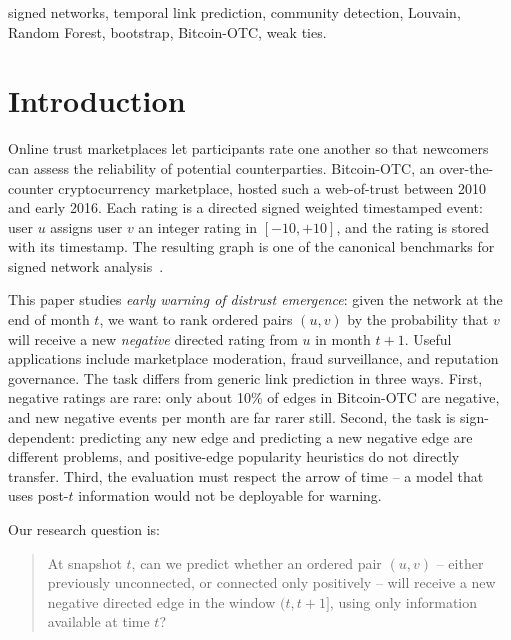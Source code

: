 \documentclass[conference]{IEEEtran}
\begin{document}
\begin{IEEEkeywords}
signed networks, temporal link prediction, community detection,
Louvain, Random Forest, bootstrap, Bitcoin-OTC, weak ties.
\end{IEEEkeywords}

\section{Introduction}

Online trust marketplaces let participants rate one another so that
newcomers can assess the reliability of potential counterparties.
Bitcoin-OTC, an over-the-counter cryptocurrency marketplace, hosted
such a web-of-trust between 2010 and early 2016. Each rating is a
directed signed weighted timestamped event: user $u$ assigns user $v$
an integer rating in $[-10, +10]$, and the rating is stored with its
timestamp. The resulting graph is one of the canonical benchmarks for
signed network analysis~\cite{kumar2016}.

This paper studies \emph{early warning of distrust emergence}: given
the network at the end of month $t$, we want to rank ordered pairs
$(u, v)$ by the probability that $v$ will receive a new \emph{negative}
directed rating from $u$ in month $t+1$. Useful applications include
marketplace moderation, fraud surveillance, and reputation governance.
The task differs from generic link prediction in three ways. First,
negative ratings are rare: only about 10\% of edges in Bitcoin-OTC are
negative, and new negative events per month are far rarer still.
Second, the task is sign-dependent: predicting any new edge and
predicting a new negative edge are different problems, and positive-edge
popularity heuristics do not directly transfer. Third, the evaluation
must respect the arrow of time -- a model that uses post-$t$
information would not be deployable for warning.

Our research question is:
\begin{quote}
At snapshot $t$, can we predict whether an ordered pair $(u, v)$ --
either previously unconnected, or connected only positively -- will
receive a new negative directed edge in the window
$(t, t{+}1]$, using only information available at time $t$?
\end{quote}
\end{document}
